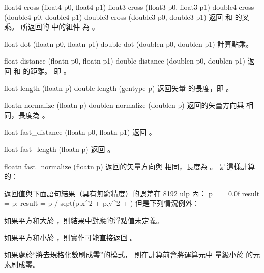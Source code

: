 float4 cross (float4 p0, float4 p1)
float3 cross (float3 p0, float3 p1)
double4 cross (double4 p0, double4 p1)
double3 cross (double3 p0, double3 p1)
\stopbuffer
{}
返回  和  的叉乘。
所返回的  中的組件  為 。
\stopbuffer

float dot (floatn p0, floatn p1)
double dot (doublen p0, doublen p1)
\stopbuffer
{}
計算點乘。
\stopbuffer

float distance (floatn p0,
		floatn p1)
double distance (doublen p0,
		doublen p1)
\stopbuffer
{}
返回  和  的距離。
即 。
\stopbuffer

float length (floatn p)
double length (gentype p)
\stopbuffer
{}
返回矢量  的長度，即 。
\stopbuffer

floatn normalize (floatn p)
doublen normalize (doublen p)
\stopbuffer
{}
返回的矢量方向與  相同，長度為 。
\stopbuffer

float fast_distance (floatn p0,
		floatn p1)
\stopbuffer
{}
返回 。
\stopbuffer

float fast_length (floatn p)
\stopbuffer
{}
返回 。
\stopbuffer

floatn fast_normalize (floatn p)
\stopbuffer
{}
返回的矢量方向與  相同，長度為 。
 是這樣計算的：


返回值與下面語句結果（具有無窮精度）的誤差在 8192 ulp 內：
\startformula
\NC {}p == 0.0f\text{))}\NR
\NC \quad result = p;\NR
\NC {}\NR
\NC \quad result = p / sqrt(p.x^2 + p.y^2 + \cdots)
\stopformula
但是下列情況例外：
\startigNum
\item 如果平方和大於 ，則結果中對應的浮點值未定義。

\item 如果平方和小於 ，則實作可能直接返回 。

\item 如果處於“將去規格化數刷成零”的模式，
則在計算前會將運算元中
量級小於  的元素刷成零。
\stopigNum
\stopbuffer

\startCLFD


\stopCLFD

